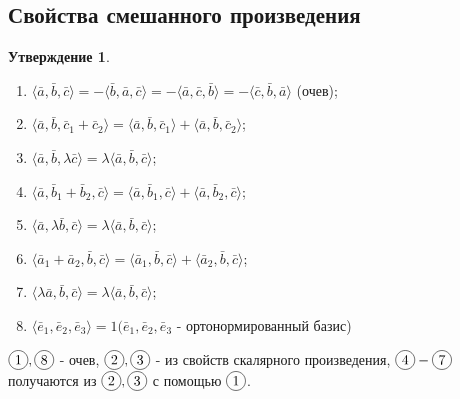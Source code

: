 \documentclass[a4paper, 12pt]{article}
\newcommand*\circled[1]{\tikz[baseline=(char.base)]{
            \node[shape=circle,draw,inner sep=2pt] (char) {#1};}}
\theoremstyle{definition}
\newtheorem*{subtheorem}{Утверждение}
\begin{document}
	\subsection{Свойства смешанного произведения}
	\begin{subtheorem}
		\begin{enumerate}
			\item $\langle \bar{a}, \bar{b}, \bar{c}\rangle = -\langle \bar{b}, \bar{a}, \bar{c}\rangle = -\langle \bar{a}, \bar{c}, \bar{b}\rangle = -\langle \bar{c}, \bar{b}, \bar{a}\rangle$ (очев);
			\item $\langle \bar{a}, \bar{b}, \bar{c}_1 + \bar{c}_2 \rangle = \langle \bar{a}, \bar{b}, \bar{c}_1\rangle + \langle \bar{a}, \bar{b}, \bar{c}_2\rangle$;
			\item $\langle \bar{a}, \bar{b}, \lambda\bar{c}\rangle = \lambda\langle \bar{a}, \bar{b}, \bar{c}\rangle$;
			\item $\langle \bar{a}, \bar{b}_1 + \bar{b}_2, \bar{c}\rangle = \langle \bar{a}, \bar{b}_1, \bar{c}\rangle + \langle \bar{a}, \bar{b}_2, \bar{c}\rangle$;
			\item $\langle \bar{a}, \lambda\bar{b}, \bar{c}\rangle = \lambda\langle \bar{a}, \bar{b}, \bar{c}\rangle$;
			\item $\langle \bar{a}_1 + \bar{a}_2, \bar{b}, \bar{c}\rangle = \langle \bar{a}_1, \bar{b}, \bar{c}\rangle + \langle \bar{a}_2, \bar{b}, \bar{c}\rangle$;
			\item $\langle \lambda\bar{a}, \bar{b}, \bar{c}\rangle = \lambda\langle \bar{a}, \bar{b}, \bar{c}\rangle$;
			\item $\langle \bar{e}_{1}, \bar{e}_{2}, \bar{e}_{3}\rangle = 1 (\bar{e}_{1}, \bar{e}_{2}, \bar{e}_{3}$ - ортонормированный базис)
		\end{enumerate}
		$\circled{1}, \circled{8}$ - очев, $\circled{2}, \circled{3}$ - из свойств скалярного произведения, $\circled{4} - \circled{7}$ получаются из $\circled{2}, \circled{3}$ с помощью $\circled{1}$.
	\end{subtheorem}
\end{document}
